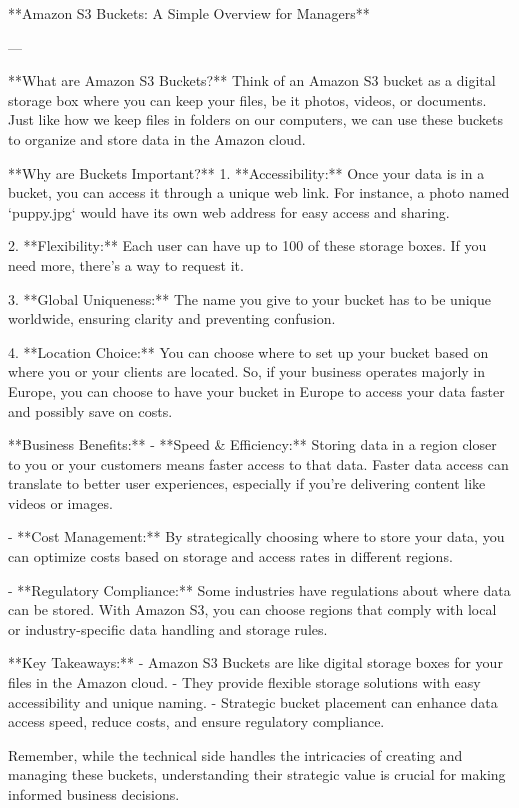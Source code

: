 **Amazon S3 Buckets: A Simple Overview for Managers**

---

**What are Amazon S3 Buckets?**
Think of an Amazon S3 bucket as a digital storage box where you can keep your files, be it photos, videos, or documents. Just like how we keep files in folders on our computers, we can use these buckets to organize and store data in the Amazon cloud.

**Why are Buckets Important?**
1. **Accessibility:** Once your data is in a bucket, you can access it through a unique web link. For instance, a photo named `puppy.jpg` would have its own web address for easy access and sharing.
   
2. **Flexibility:** Each user can have up to 100 of these storage boxes. If you need more, there's a way to request it.
   
3. **Global Uniqueness:** The name you give to your bucket has to be unique worldwide, ensuring clarity and preventing confusion.

4. **Location Choice:** You can choose where to set up your bucket based on where you or your clients are located. So, if your business operates majorly in Europe, you can choose to have your bucket in Europe to access your data faster and possibly save on costs.

**Business Benefits:**
- **Speed & Efficiency:** Storing data in a region closer to you or your customers means faster access to that data. Faster data access can translate to better user experiences, especially if you're delivering content like videos or images.

- **Cost Management:** By strategically choosing where to store your data, you can optimize costs based on storage and access rates in different regions.

- **Regulatory Compliance:** Some industries have regulations about where data can be stored. With Amazon S3, you can choose regions that comply with local or industry-specific data handling and storage rules.

**Key Takeaways:**
- Amazon S3 Buckets are like digital storage boxes for your files in the Amazon cloud.
- They provide flexible storage solutions with easy accessibility and unique naming.
- Strategic bucket placement can enhance data access speed, reduce costs, and ensure regulatory compliance.

Remember, while the technical side handles the intricacies of creating and managing these buckets, understanding their strategic value is crucial for making informed business decisions.